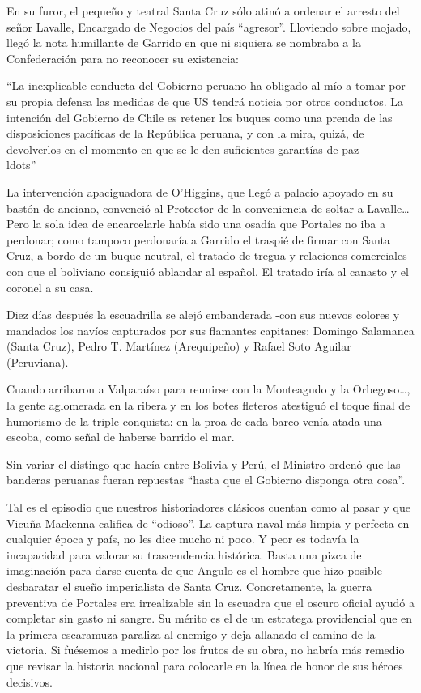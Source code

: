 \documentclass[10pt,twoside,openright]{memoir}
\begin{document}
En su furor, el pequeño y teatral Santa Cruz sólo atinó a ordenar el
arresto del señor Lavalle, Encargado de Negocios del país ``agresor''.
Lloviendo sobre mojado, llegó la nota humillante de Garrido en que ni
siquiera se nombraba a la Confederación para no reconocer su existencia:

``La inexplicable conducta del Gobierno peruano ha obligado al mío a
tomar por su propia defensa las medidas de que US tendrá noticia por
otros conductos. La intención del Gobierno de Chile es retener los
buques como una prenda de las disposiciones pacíficas de la República
peruana, y con la mira, quizá, de devolverlos en el momento en que se le
den suficientes garantías de paz\\ldots''

La intervención apaciguadora de O'Higgins, que llegó a palacio apoyado
en su bastón de anciano, convenció al Protector de la conveniencia de
soltar a Lavalle\ldots Pero la sola idea de encarcelarle había sido una
osadía que Portales no iba a perdonar; como tampoco perdonaría a Garrido
el traspié de firmar con Santa Cruz, a bordo de un buque neutral, el
tratado de tregua y relaciones comerciales con que el boliviano
consiguió ablandar al español. El tratado iría al canasto y el coronel a
su casa.

Diez días después la escuadrilla se alejó embanderada -con sus nuevos
colores y mandados los navíos capturados por sus flamantes capitanes:
Domingo Salamanca (Santa Cruz), Pedro T. Martínez (Arequipeño) y Rafael
Soto Aguilar (Peruviana).

Cuando arribaron a Valparaíso para reunirse con la Monteagudo y la
Orbegoso\ldots, la gente aglomerada en la ribera y en los botes fleteros
atestiguó el toque final de humorismo de la triple conquista: en la proa
de cada barco venía atada una escoba, como señal de haberse barrido el
mar.

Sin variar el distingo que hacía entre Bolivia y Perú, el Ministro
ordenó que las banderas peruanas fueran repuestas ``hasta que el Gobierno
disponga otra cosa''.

Tal es el episodio que nuestros historiadores clásicos cuentan como al
pasar y que Vicuña Mackenna califica de ``odioso''. La captura naval más
limpia y perfecta en cualquier época y país, no les dice mucho ni poco.
Y peor es todavía la incapacidad para valorar su trascendencia
histórica. Basta una pizca de imaginación para darse cuenta de que
Angulo es el hombre que hizo posible desbaratar el sueño imperialista de
Santa Cruz. Concretamente, la guerra preventiva de Portales era
irrealizable sin la escuadra que el oscuro oficial ayudó a completar sin
gasto ni sangre. Su mérito es el de un estratega providencial que en la
primera escaramuza paraliza al enemigo y deja allanado el camino de la
victoria. Si fuésemos a medirlo por los frutos de su obra, no habría más
remedio que revisar la historia nacional para colocarle en la línea de
honor de sus héroes decisivos.
\end{document}
